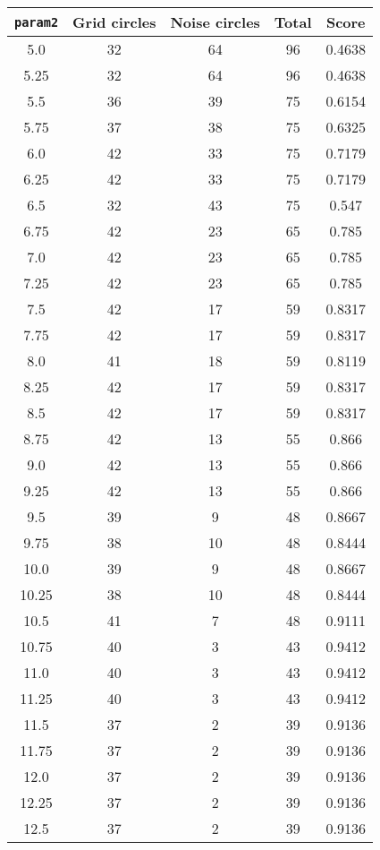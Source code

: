 \documentclass[letterpaper, 12pt]{article}
\begin{document}
\begin{longtable}{|c|c|c|c|c|}
\hline
\textbf{\texttt{param2}} & \textbf{Grid circles} & \textbf{Noise circles} & \textbf{Total} & \textbf{Score} \\
\hline
5.0 & 32 & 64 & 96 & 0.4638 \\
\hline
5.25 & 32 & 64 & 96 & 0.4638 \\
\hline
5.5 & 36 & 39 & 75 & 0.6154 \\
\hline
5.75 & 37 & 38 & 75 & 0.6325 \\
\hline
6.0 & 42 & 33 & 75 & 0.7179 \\
\hline
6.25 & 42 & 33 & 75 & 0.7179 \\
\hline
6.5 & 32 & 43 & 75 & 0.547 \\
\hline
6.75 & 42 & 23 & 65 & 0.785 \\
\hline
7.0 & 42 & 23 & 65 & 0.785 \\
\hline
7.25 & 42 & 23 & 65 & 0.785 \\
\hline
7.5 & 42 & 17 & 59 & 0.8317 \\
\hline
7.75 & 42 & 17 & 59 & 0.8317 \\
\hline
8.0 & 41 & 18 & 59 & 0.8119 \\
\hline
8.25 & 42 & 17 & 59 & 0.8317 \\
\hline
8.5 & 42 & 17 & 59 & 0.8317 \\
\hline
8.75 & 42 & 13 & 55 & 0.866 \\
\hline
9.0 & 42 & 13 & 55 & 0.866 \\
\hline
9.25 & 42 & 13 & 55 & 0.866 \\
\hline
9.5 & 39 & 9 & 48 & 0.8667 \\
\hline
9.75 & 38 & 10 & 48 & 0.8444 \\
\hline
10.0 & 39 & 9 & 48 & 0.8667 \\
\hline
10.25 & 38 & 10 & 48 & 0.8444 \\
\hline
10.5 & 41 & 7 & 48 & 0.9111 \\
\hline
10.75 & 40 & 3 & 43 & 0.9412 \\
\hline
11.0 & 40 & 3 & 43 & 0.9412 \\
\hline
11.25 & 40 & 3 & 43 & 0.9412 \\
\hline
11.5 & 37 & 2 & 39 & 0.9136 \\
\hline
11.75 & 37 & 2 & 39 & 0.9136 \\
\hline
12.0 & 37 & 2 & 39 & 0.9136 \\
\hline
12.25 & 37 & 2 & 39 & 0.9136 \\
\hline
12.5 & 37 & 2 & 39 & 0.9136 \\

\end{longtable}
\end{document}
